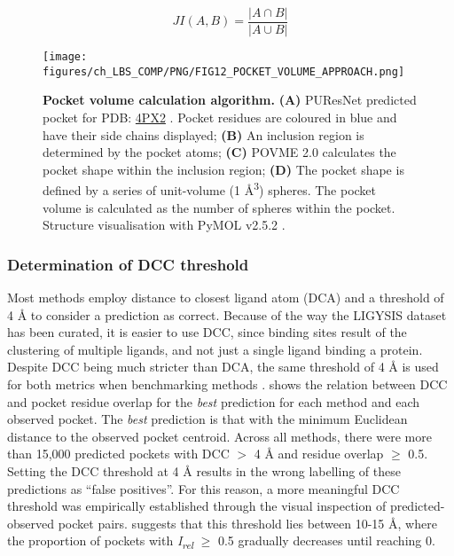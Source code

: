 \begin{equation}
JI(A, B) = \frac{|A \cap B|}{|A \cup B|}
\label{eq:jaccard_index}
\end{equation}

\begin{figure}[h]
    \centering
    \texttt{[image: figures/ch\_LBS\_COMP/PNG/FIG12\_POCKET\_VOLUME\_APPROACH.png]}
    \caption[Pocket volume calculation algorithm]{\textbf{Pocket volume calculation algorithm.} \textbf{(A)} PUResNet predicted pocket for PDB: \href{https://www.ebi.ac.uk/pdbe/entry/pdb/4PX2}{4PX2} \cite{PDB_4PX2}. Pocket residues are coloured in blue and have their side chains displayed; \textbf{(B)} An inclusion region is determined by the pocket atoms; \textbf{(C)} POVME 2.0 calculates the pocket shape within the inclusion region; \textbf{(D)} The pocket shape is defined by a series of unit-volume (1 \AA{}\textsuperscript{3}) spheres. The pocket volume is calculated as the number of spheres within the pocket. Structure visualisation with PyMOL v2.5.2 \cite{SCHRODINGER_2015_PYMOL}.}
    \label{fig:protein_volume_approach}
\end{figure}

\vspace{-12pt} %
\vspace{-12pt} %

\subsubsection{Determination of DCC threshold}
\label{subsub:determining_dcc_thresh}

Most methods employ distance to closest ligand atom  (DCA) and a threshold of 4 \AA{} to consider a prediction as correct. Because of the way the LIGYSIS dataset has been curated, it is easier to use DCC, since binding sites result of the clustering of multiple ligands, and not just a single ligand binding a protein. Despite DCC being much stricter than DCA, the same threshold of 4 \AA{} is used for both metrics when benchmarking methods \cite{AGGARWAL_2022_DEEPPOCKET, SESTAK_2024_VNEGNN, KANDEL_2021_PURESNET}.  shows the relation between DCC and pocket residue overlap for the \textit{best} prediction for each method and each observed pocket. The \textit{best} prediction is that with the minimum Euclidean distance to the observed pocket centroid. Across all methods, there were more than 15,000 predicted pockets with DCC $>$ 4 \AA{} and residue overlap $\geq$ 0.5. Setting the DCC threshold at 4 \AA{} results in the wrong labelling of these predictions as ``false positives''. For this reason, a more meaningful DCC threshold was empirically established through the visual inspection of predicted-observed pocket pairs.  suggests that this threshold lies between 10-15 \AA{}, where the proportion of pockets with \textit{I\textsubscript{rel}} $\geq$ 0.5 gradually decreases until reaching 0.

